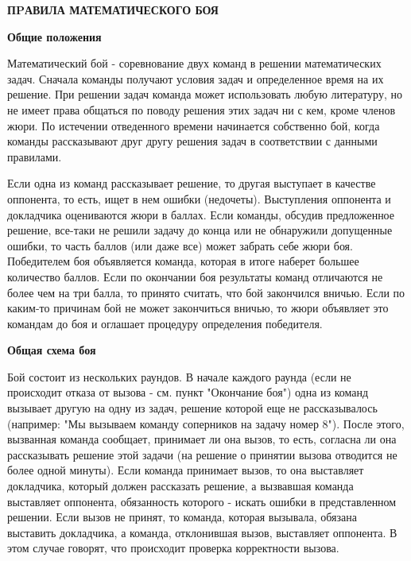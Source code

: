 \documentclass{article}
\begin{document}
\large
	

\begin{center}
	\textbf{ПPАВИЛА МАТЕМАТИЧЕСКОГО БОЯ}
\end{center}
\begin{center}
	\textbf{Общие положения}
\end{center}

Математический бой - соревнование двух команд в решении математических задач. Сначала команды получают условия задач и определенное время на их решение. При решении задач команда может использовать любую литературу, но не имеет права общаться по поводу решения этих задач ни с кем, кроме членов жюри. По истечении отведенного времени начинается собственно бой, когда команды рассказывают друг другу решения задач в соответствии с данными правилами.

Если одна из команд рассказывает решение, то другая выступает в качестве оппонента, то есть, ищет в нем ошибки (недочеты). Выступления оппонента и докладчика оцениваются жюри в баллах. Если команды, обсудив предложенное решение, все-таки не решили задачу до конца или не обнаружили допущенные ошибки, то часть баллов (или даже все) может забрать себе жюри боя. Победителем боя объявляется команда, которая в итоге наберет большее количество баллов. Если по окончании боя результаты команд отличаются не более чем на три балла, то принято считать, что бой закончился вничью. Если по каким-то причинам бой не может закончиться вничью, то жюри объявляет это командам до боя и оглашает процедуру определения победителя.

\begin{center}
\textbf{Общая схема боя}
\end{center}

Бой состоит из нескольких раундов. В начале каждого раунда (если не происходит отказа от вызова - см. пункт "Окончание боя") одна из команд вызывает другую на одну из задач, решение которой еще не рассказывалось (например: "Мы вызываем команду соперников на задачу номер 8"). После этого, вызванная команда сообщает, принимает ли она вызов, то есть, согласна ли она рассказывать решение этой задачи (на решение о принятии вызова отводится не более одной минуты). Если команда принимает вызов, то она выставляет докладчика, который должен рассказать решение, а вызвавшая команда выставляет оппонента, обязанность которого - искать ошибки в представленном решении. Если вызов не принят, то команда, которая вызывала, обязана выставить докладчика, а команда, отклонившая вызов, выставляет оппонента. В этом случае говорят, что происходит проверка корректности вызова.
\end{document}
